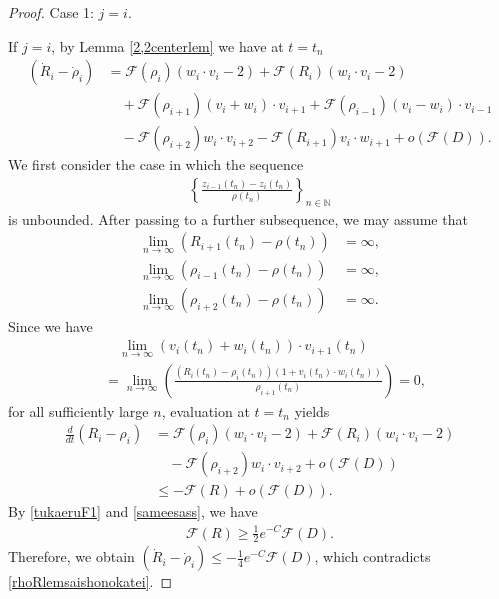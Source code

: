 \documentclass[10pt,a4paper]{amsart}
\numberwithin{equation}{section}
\begin{document}
\begin{proof}
Case 1: $j=i$.


If $j=i$, by Lemma \ref{2,2centerlem} we have at $t=t_n$
\begin{align*}
\left(\dot{R}_i-\dot{\rho}_i\right)
&=
\mathcal{F}(\rho_i)(w_i\cdot v_i-2)
+\mathcal{F}(R_i)(w_i\cdot v_i-2)
\\
&\quad
+\mathcal{F}(\rho_{i+1})(v_i+w_i)\cdot v_{i+1}
+\mathcal{F}(\rho_{i-1})(v_i-w_i)\cdot v_{i-1}
\\
&\quad
-\mathcal{F}(\rho_{i+2})w_i\cdot v_{i+2}
-\mathcal{F}(R_{i+1})v_i\cdot w_{i+1}
+o\left(\mathcal{F}(D)\right).
\end{align*}
We first consider the case in which the sequence
\begin{align*}
\left\{
\frac{z_{i-1}(t_n)-z_i(t_n)}{\rho(t_n)}
\right\}_{n\in\mathbb{N}}
\end{align*}
is unbounded. After passing to a further subsequence, we may assume that
\begin{align*}
\lim_{n\to\infty}\left(R_{i+1}(t_n)-\rho(t_n)\right)&=\infty,
\\
\lim_{n\to\infty}\left(\rho_{i-1}(t_n)-\rho(t_n)\right)&=\infty,
\\
\lim_{n\to\infty}\left(\rho_{i+2}(t_n)-\rho(t_n)\right)&=\infty.
\end{align*}
Since we have
\begin{align*}
&\quad \lim_{n\to\infty}\left(v_i(t_n)+w_i(t_n)\right)\cdot v_{i+1}(t_n)
\\
&=\lim_{n\to\infty}\left(\frac{\left(R_i(t_n)-\rho_i(t_n)\right)\left(1+v_i(t_n)\cdot w_i(t_n)\right)}{\rho_{i+1}(t_n)}\right)=0,
\end{align*}
for all sufficiently large $n$, evaluation at $t=t_n$ yields
\begin{align*}
\frac{d}{dt}\left(R_i-\rho_i\right)&=\mathcal{F}(\rho_i)(w_i\cdot v_i-2)+\mathcal{F}(R_i)(w_i\cdot v_i-2)
\\
&\quad -\mathcal{F}(\rho_{i+2})w_i\cdot v_{i+2}+o\left(\mathcal{F}(D)\right)
\\
&\leq -\mathcal{F}(R)+o\left(\mathcal{F}(D)\right).
\end{align*}
By \eqref{tukaeruF1} and \eqref{sameesass}, we have
\begin{align*}
\mathcal{F}(R)\geq \frac{1}{2}e^{-C}\mathcal{F}(D).
\end{align*}
Therefore, we obtain $\left(\dot{R}_i-\dot{\rho}_i\right)\leq -\frac{1}{4}e^{-C}\mathcal{F}(D)$, which contradicts \eqref{rhoRlemsaishonokatei}.


\end{proof}
\end{document}
